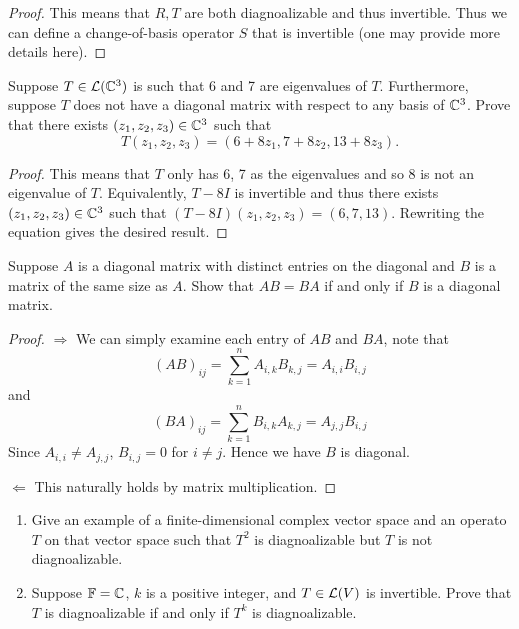 \documentclass{extarticle}
\begin{document}
\begin{proof}
This means that \(R, T\) are both diagnoalizable and thus invertible. Thus we can define a change-of-basis 
operator \(S\) that is invertible (one may provide more details here).
\end{proof}

\begin{problem}{12}
    Suppose \(T \in \mathcal{L}(\mathbb{C}^3)\) is such that 6 and 7 are eigenvalues of \(T\). Furthermore, suppose \(T\) 
    does not have a diagonal matrix with respect to any basis of \(\mathbb{C}^3\). Prove that there exists 
    \((z_1, z_2, z_3) \in \mathbb{C}^3\) such that 
    \[T(z_1, z_2, z_3) = (6 + 8 z_1, 7 + 8z_2, 13 + 8 z_3).\]
\end{problem}

\begin{proof}
This means that \(T\) only has 6, 7 as the eigenvalues and so 8 is not an eigenvalue of \(T\). Equivalently, 
\(T - 8I\) is invertible and thus there exists \((z_1, z_2, z_3) \in \mathbb{C}^3\) such that \((T - 8I) 
(z_1, z_2, z_3) = (6, 7, 13)\). Rewriting the equation gives the desired result. 
\end{proof}

\begin{problem}{13}
    Suppose \(A\) is a diagonal matrix with distinct entries on the diagonal and \(B\) is a matrix of the same 
    size as \(A\). Show that \(AB = BA\) if and only if \(B\) is a diagonal matrix. 
\end{problem}

\begin{proof}
\(\Rightarrow\) We can simply examine each entry of \(AB\) and \(BA\), note that 
\[(AB)_{ij} = \sum_{k=1}^{n}A_{i, k}B_{k, j} = A_{i, i} B_{i, j}\]
and 
\[(BA)_{ij} = \sum_{k=1}^{n}B_{i, k}A_{k, j} = A_{j, j} B_{i, j}\]
Since \(A_{i, i} \neq A_{j, j}\), \(B_{i, j} = 0\) for \(i \neq j\). Hence we have \(B\) is diagonal. 

\(\Leftarrow\) This naturally holds by matrix multiplication. 
\end{proof}

\begin{problem}{14}
    \begin{enumerate}[label=(\alph*)]
        \item Give an example of a finite-dimensional complex vector space and an operato \(T\) on 
        that vector space such that \(T^2\) is diagnoalizable but \(T\) is not diagnoalizable. 
        \item Suppose \(\mathbb{F} = \mathbb{C}\), \(k\) is a positive integer, and \(T \in \mathcal{L}(V)\) is invertible. 
        Prove that \(T\) is diagnoalizable if and only if \(T^k\) is diagnoalizable.
    \end{enumerate}
\end{problem}
\end{document}
